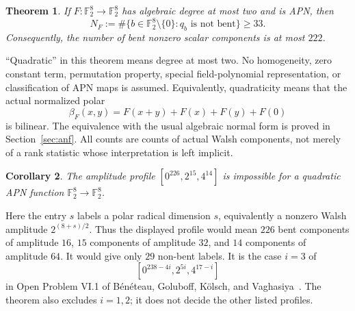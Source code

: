 \documentclass[11pt,a4paper]{article}
\numberwithin{equation}{section}
\newtheorem{theorem}{Theorem}[section]
\newtheorem{corollary}[theorem]{Corollary}
\theoremstyle{definition}
\newcommand{\F}{\mathbb F_2}
\begin{document}
\begin{theorem}\label{thm:main}
If $F\colon\F^8\to\F^8$ has algebraic degree at most two and is APN, then
\[
N_F:=\#\{b\in\F^8\setminus\{0\}:q_b\text{ is not bent}\}\ge33.
\]
Consequently, the number of bent nonzero scalar components is at most $222$.
\end{theorem}

``Quadratic'' in this theorem means degree at most two. No homogeneity, zero constant term, permutation property, special field-polynomial representation, or classification of APN maps is assumed. Equivalently, quadraticity means that the actual normalized polar
\[
\beta_F(x,y)=F(x+y)+F(x)+F(y)+F(0)
\]
is bilinear. The equivalence with the usual algebraic normal form is proved in Section~\ref{sec:anf}. All counts are counts of actual Walsh components, not merely of a rank statistic whose interpretation is left implicit.

\begin{corollary}\label{cor:profile}
The amplitude profile $[0^{226},2^{15},4^{14}]$ is impossible for a quadratic APN function $\F^8\to\F^8$.
\end{corollary}
Here the entry $s$ labels a polar radical dimension $s$, equivalently a nonzero Walsh amplitude $2^{(8+s)/2}$. Thus the displayed profile would mean $226$ bent components of amplitude $16$, $15$ components of amplitude $32$, and $14$ components of amplitude $64$. It would give only $29$ non-bent labels. It is the case $i=3$ of
\begin{equation}\label{eq:profile-family}
[0^{238-4i},2^{5i},4^{17-i}]
\end{equation}
in Open Problem VI.1 of B\'en\'eteau, Goluboff, K\"olsch, and Vaghasiya~\cite{BGKV}. The theorem also excludes $i=1,2$; it does not decide the other listed profiles.
\end{document}
